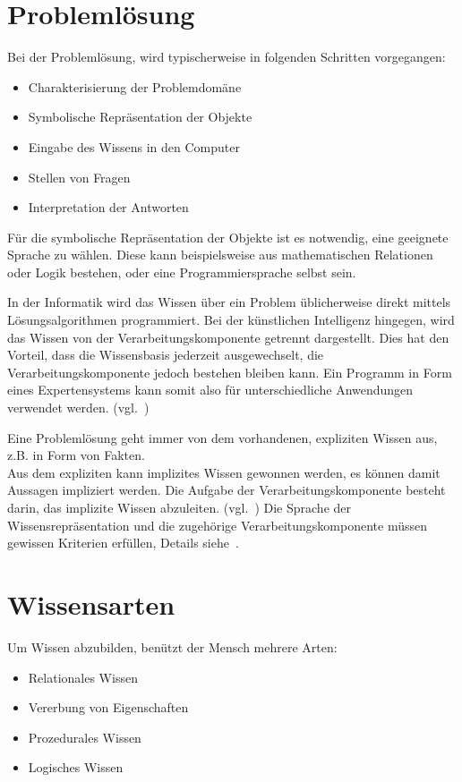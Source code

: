 \newpage

\section{Problemlösung}
\label{sec:experten_systeme_problemloesung}
Bei der Problemlösung, wird typischerweise in folgenden Schritten vorgegangen:
\begin{itemize}
    \item Charakterisierung der Problemdomäne
    \item Symbolische Repräsentation der Objekte
    \item Eingabe des Wissens in den Computer
    \item Stellen von Fragen
    \item Interpretation der Antworten
\end{itemize}

Für die symbolische Repräsentation der Objekte ist es notwendig, eine geeignete Sprache zu wählen. Diese kann beispielsweise aus mathematischen Relationen oder Logik bestehen, oder eine Programmiersprache selbst sein.

In der Informatik wird das Wissen über ein Problem üblicherweise direkt mittels Lösungsalgorithmen programmiert. Bei der künstlichen Intelligenz hingegen, wird das Wissen von der Verarbeitungskomponente getrennt dargestellt. Dies hat den Vorteil, dass die Wissensbasis jederzeit ausgewechselt, die Verarbeitungskomponente jedoch bestehen bleiben kann. Ein Programm in Form eines Expertensystems kann somit also für unterschiedliche Anwendungen verwendet werden. (vgl.~\cite[S. 28 - 30]{laemmel})

Eine Problemlösung geht immer von dem vorhandenen, expliziten Wissen aus, z.B. in Form von Fakten.\\
Aus dem expliziten kann implizites Wissen gewonnen werden, es können damit Aussagen impliziert werden. Die Aufgabe der Verarbeitungskomponente besteht darin, das implizite Wissen abzuleiten. (vgl.~\cite[S. 30 - 31]{laemmel}) Die Sprache der Wissensrepräsentation und die zugehörige Verarbeitungskomponente müssen gewissen Kriterien erfüllen, Details siehe~\cite[S. 31]{laemmel}.

\section{Wissensarten}
\label{sec:experten_systeme_wissensarten}
Um Wissen abzubilden, benützt der Mensch mehrere Arten:
\begin{itemize}
    \item Relationales Wissen
    \item Vererbung von Eigenschaften
    \item Prozedurales Wissen
    \item Logisches Wissen
\end{itemize}
\label{itm:wissensarten}

